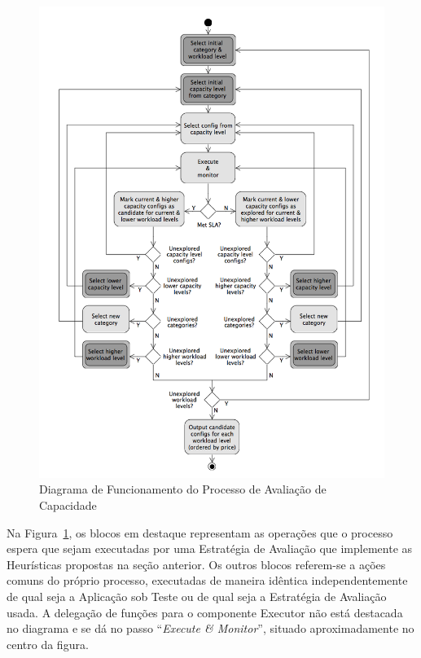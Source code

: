 \begin{figure}[hbt]
  \caption{\label{fig:fig_processo_aval_capacidade}Diagrama de Funcionamento do Processo de Avaliação de Capacidade}
  \begin{center}
    \includegraphics[scale=0.45]{img/capacity-planning-diagram-v13-mono}
  \end{center}
\end{figure}

Na Figura~\ref{fig:fig_processo_aval_capacidade}, os blocos em destaque representam
as operações que o processo espera que sejam executadas por uma Estratégia de 
Avaliação que implemente as Heurísticas propostas na seção anterior. Os outros 
blocos referem-se a ações comuns do próprio processo, executadas de maneira 
idêntica independentemente de qual seja a Aplicação sob Teste ou de qual seja a 
Estratégia de Avaliação usada. A delegação de funções para o componente Executor 
não está destacada no diagrama e se dá no passo ``\emph{Execute \& Monitor}'', 
situado aproximadamente no centro da figura.

